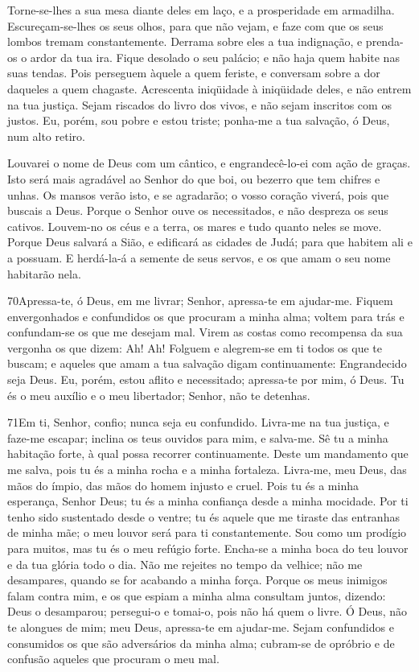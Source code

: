 Torne-se-lhes a sua mesa diante deles em laço, e a prosperidade
em armadilha. Escureçam-se-lhes os seus olhos, para que não
vejam, e faze com que os seus lombos tremam constantemente.
Derrama sobre eles a tua indignação, e prenda-os o ardor da
tua ira. Fique desolado o seu palácio; e não haja quem habite
nas suas tendas. Pois perseguem àquele a quem feriste, e
conversam sobre a dor daqueles a quem chagaste. Acrescenta
iniqüidade à iniqüidade deles, e não entrem na tua justiça.
Sejam riscados do livro dos vivos, e não sejam inscritos com
os justos. Eu, porém, sou pobre e estou triste; ponha-me a
tua salvação, ó Deus, num alto retiro.

Louvarei o nome de Deus com um cântico, e engrandecê-lo-ei com
ação de graças. Isto será mais agradável ao Senhor do que
boi, ou bezerro que tem chifres e unhas. Os mansos verão
isto, e se agradarão; o vosso coração viverá, pois que buscais a
Deus. Porque o Senhor ouve os necessitados, e não despreza os
seus cativos. Louvem-no os céus e a terra, os mares e tudo
quanto neles se move. Porque Deus salvará a Sião, e edificará
as cidades de Judá; para que habitem ali e a possuam. E
herdá-la-á a semente de seus servos, e os que amam o seu nome
habitarão nela.

\bigskip

\lettrine{70}{}Apressa-te, ó Deus, em me livrar; Senhor,
apressa-te em ajudar-me. Fiquem envergonhados e confundidos os
que procuram a minha alma; voltem para trás e confundam-se os que me
desejam mal. Virem as costas como recompensa da sua vergonha os
que dizem: Ah! Ah! Folguem e alegrem-se em ti todos os que te
buscam; e aqueles que amam a tua salvação digam continuamente:
Engrandecido seja Deus. Eu, porém, estou aflito e necessitado;
apressa-te por mim, ó Deus. Tu és o meu auxílio e o meu libertador;
Senhor, não te detenhas.

\bigskip

\lettrine{71}{}Em ti, Senhor, confio; nunca seja eu confundido.
Livra-me na tua justiça, e faze-me escapar; inclina os teus
ouvidos para mim, e salva-me. Sê tu a minha habitação forte, à
qual possa recorrer continuamente. Deste um mandamento que me salva,
pois tu és a minha rocha e a minha fortaleza. Livra-me, meu
Deus, das mãos do ímpio, das mãos do homem injusto e cruel. Pois
tu és a minha esperança, Senhor Deus; tu és a minha confiança desde
a minha mocidade. Por ti tenho sido sustentado desde o ventre;
tu és aquele que me tiraste das entranhas de minha mãe; o meu louvor
será para ti constantemente. Sou como um prodígio para muitos,
mas tu és o meu refúgio forte. Encha-se a minha boca do teu
louvor e da tua glória todo o dia. Não me rejeites no tempo da
velhice; não me desampares, quando se for acabando a minha força.
Porque os meus inimigos falam contra mim, e os que espiam a
minha alma consultam juntos, dizendo: Deus o desamparou;
persegui-o e tomai-o, pois não há quem o livre. Ó Deus, não
te alongues de mim; meu Deus, apressa-te em ajudar-me. Sejam
confundidos e consumidos os que são adversários da minha alma;
cubram-se de opróbrio e de confusão aqueles que procuram o meu mal.

